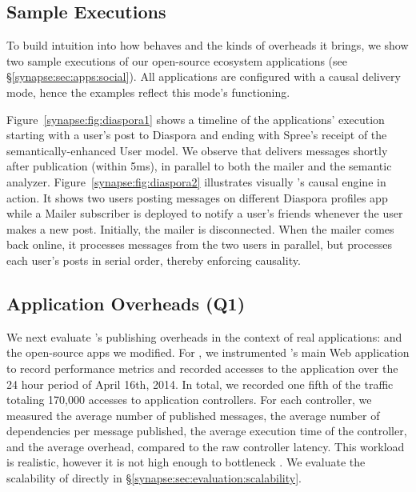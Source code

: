 \subsection{Sample Executions}
\label{synapse:sec:evaluation:sample-runs}

To build intuition into how \synapse behaves and the kinds of overheads it
brings, we show two sample executions of our open-source ecosystem
applications (see \S\ref{synapse:sec:apps:social}). All applications are configured
with a causal delivery mode, hence the examples reflect this mode's functioning.

Figure~\ref{synapse:fig:diaspora1} shows a timeline of the applications' execution
starting with a user's post to Diaspora and ending with Spree's receipt of the
semantically-enhanced User model. We observe that \synapse delivers messages
shortly after publication (within 5ms), in parallel to both the mailer and
the semantic analyzer.  Figure~\ref{synapse:fig:diaspora2}  illustrates visually
\synapse's causal engine in action. It shows two users posting messages on
different Diaspora profiles app while a Mailer subscriber is deployed to notify
a user's friends whenever the user makes a new post.  Initially, the mailer is
disconnected. When the mailer comes back online, it processes messages from the
two users in parallel, but processes each user's posts in serial order, thereby
enforcing causality.

\setlength{\tabcolsep}{4pt}

\subsection{Application Overheads (Q1)}
\label{synapse:sec:evaluation:overhead}

We next evaluate \synapse's publishing overheads in the context of real
applications: \crowdtap and the open-source apps we modified. For \crowdtap, we
instrumented \crowdtap's main Web application to record performance metrics and
recorded accesses to the application over the 24 hour period of April 16th,
2014. In total, we recorded one fifth of the traffic totaling 170,000 accesses
to application controllers. For each controller, we measured the average
number of published messages, the average number of dependencies per message
published, the average execution time of the controller, and the average
\synapse overhead, compared to the raw controller latency. This workload is
realistic, however it is not high enough to bottleneck \synapse. We evaluate
the scalability of \synapse directly in \S\ref{synapse:sec:evaluation:scalability}.

